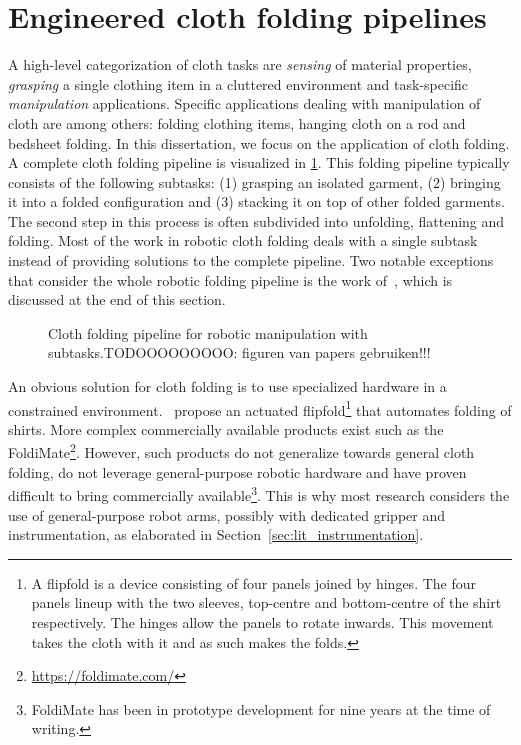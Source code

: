 \section{Engineered cloth folding pipelines} \label{sec:lit_cloth_folding_pipelines}
A high-level categorization of cloth tasks are \emph{sensing} of material properties, \emph{grasping} a single clothing item in a cluttered environment and task-specific \emph{manipulation} applications. Specific applications dealing with manipulation of cloth are among others: folding clothing items, hanging cloth on a rod and bedsheet folding. In this dissertation, we focus on the application of cloth folding. A complete cloth folding pipeline is visualized in \cref{fig:complete_folding_pipeline}. This folding pipeline typically consists of the following subtasks: (1) grasping an isolated garment, (2) bringing it into a folded configuration and (3) stacking it on top of other folded garments. The second step in this process is often subdivided into unfolding, flattening and folding. Most of the work in robotic cloth folding deals with a single subtask instead of providing solutions to the complete pipeline. Two notable exceptions that consider the whole robotic folding pipeline is the work of~\textcite{Doumanoglou2016,Maitin2010}, which is discussed at the end of this section.

\begin{figure}[htbp!]
    \centering
    
    \caption{Cloth folding pipeline for robotic manipulation with subtasks.TODOOOOOOOOO: figuren van papers gebruiken!!!} 
    \label{fig:complete_folding_pipeline}
\end{figure}

An obvious solution for cloth folding is to use specialized hardware in a constrained environment.~\Textcite{Nair2013} propose an actuated flipfold\footnote{A flipfold is a device consisting of four panels joined by hinges. The four panels lineup with the two sleeves, top-centre and bottom-centre of the shirt respectively. The hinges allow the panels to rotate inwards. This movement takes the cloth with it and as such makes the folds.} that automates folding of shirts. More complex commercially available products exist such as the FoldiMate\textregistered\footnote{\url{https://foldimate.com/}}. However, such products do not generalize towards general cloth folding, do not leverage general-purpose robotic hardware and have proven difficult to bring commercially available\footnote{FoldiMate has been in prototype development for nine years at the time of writing.}. This is why most research considers the use of general-purpose robot arms, possibly with dedicated gripper and instrumentation, as elaborated in Section~\ref{sec:lit_instrumentation}.

